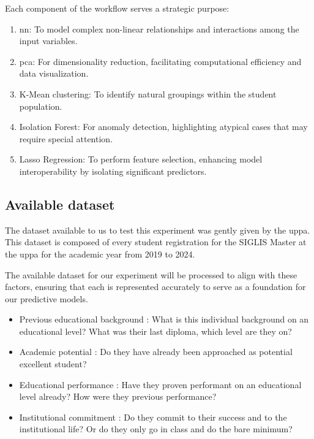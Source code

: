 \documentclass[../main.tex]{subfiles}
\begin{document}
Each component of the workflow serves a strategic purpose:

\begin{enumerate}
    \item \acrfull{nn}: To model complex non-linear relationships and interactions among the input variables.
    \item \acrfull{pca}: For dimensionality reduction, facilitating computational efficiency and data visualization.
    \item K-Mean clustering: To identify natural groupings within the student population.
    \item Isolation Forest: For anomaly detection, highlighting atypical cases that may require special attention.
    \item Lasso Regression: To perform feature selection, enhancing model interoperability by isolating significant predictors.
\end{enumerate}

\subsection{Available dataset}
\label{subsec:available_ds}
The dataset available to us to test this experiment was gently given by the \acrfull{uppa}.
This dataset is composed of every student registration for the SIGLIS Master at the \acrshort{uppa} for the academic year from 2019 to 2024.

The available dataset for our experiment will be processed to align with these factors, ensuring that each is represented accurately to serve as a foundation for our predictive models.
\begin{itemize}
    \item Previous educational background : What is this individual background on an educational level? What was their last diploma, which level are they on? 
    \item Academic potential : Do they have already been approached as potential excellent student?
    \item Educational performance : Have they proven performant on an educational level already? How were they previous performance?
    \item Institutional commitment : Do they commit to their success and to the institutional life? Or do they only go in class and do the bare minimum?
\end{itemize}
\end{document}
